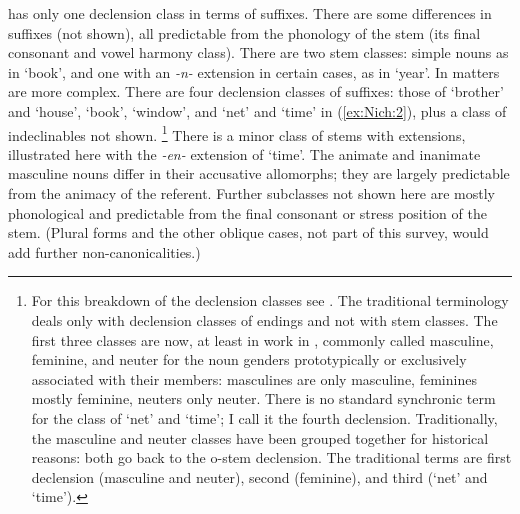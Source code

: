 \documentclass[output=collectionpaper]{langsci/langscibook}
\begin{document}
 has only one declension class in terms of suffixes. There are some differences in suffixes (not shown), all predictable from the phonology of the stem (its final consonant and vowel harmony class). There are two stem classes: simple nouns as in `book', and one with an \textit{-n-} extension in certain cases, as in `year'. In  matters are more complex. There are four declension classes of suffixes: those of `brother' and `house', `book', `window', and `net' and `time' in (\ref{ex:Nich:2}), plus a class of indeclinables not shown.%
\footnote{%
For this breakdown of the  declension classes see \citet{Corbett1982}. The traditional terminology deals only with declension classes of endings and not with stem classes. The first three classes are now, at least in work in , commonly called masculine, feminine, and neuter for the noun genders prototypically or exclusively associated with their members: masculines are only masculine, feminines mostly feminine, neuters only neuter. There is no standard synchronic term for the class of `net' and `time'; I call it the fourth declension. Traditionally, the masculine and neuter classes have been grouped together for historical reasons: both go back to the  o-stem declension. The traditional terms are first declension (masculine and neuter), second (feminine), and third (`net' and `time').
} %
There is a minor class of stems with extensions, illustrated here with the \textit{-en-} extension of `time'. The animate and inanimate masculine nouns differ in their accusative allomorphs; they are largely predictable from the animacy of the referent. Further subclasses not shown here are mostly phonological and predictable from the final consonant or stress position of the stem. (Plural forms and the other oblique cases, not part of this survey, would add further non-canonicalities.)
\end{document}
